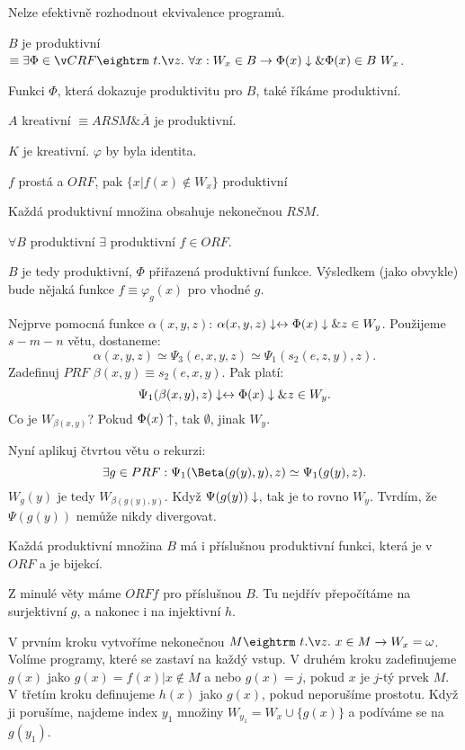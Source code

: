 \res{} Nelze efektivně rozhodnout ekvivalence programů.


\dfn{} $B$ je produktivní $\equiv \exists \Phi \in ČRF \st \forall x: W_x \in B \then \Phi(x) \da \& \Phi(x) \in B \ W_x$.

\dfn{} Funkci $\Phi$, která dokazuje produktivitu pro $B$, také říkáme produktivní.

\dfn{} $A$ kreativní $\equiv A RSM \& \overline{A}$ je produktivní.

\obs{} $K$ je kreativní. $\varphi$ by byla identita.

\obs{} $f$ prostá a $ORF$, pak $\{x | f(x) \not \in W_x\}$ produktivní

\obs{} Každá produktivní množina obsahuje nekonečnou $RSM$. 

 $\forall B$ produktivní $\exists$ produktivní $f \in ORF$.

\prf{}
$B$ je tedy produktivní, $\Phi$ přiřazená produktivní funkce. Výsledkem (jako obvykle) bude
nějaká funkce $f \equiv \varphi_g(x)$ pro vhodné $g$.

Nejprve pomocná funkce $\alpha(x,y,z)$: $\alpha(x,y,z)\downarrow \leftrightarrow \Phi(x)\downarrow \& z \in W_y$.
Použijeme $s-m-n$ větu, dostaneme:
$$ \alpha(x,y,z) \simeq \Psi_3(e,x,y,z) \simeq \Psi_1(s_2(e,z,y),z).$$
Zadefinuj $PRF$ $\beta(x,y) \equiv s_2(e,x,y)$. Pak platí:
$$ \Psi_1(\beta(x,y),z) \downarrow \leftrightarrow \Phi(x)\downarrow \& z \in W_y. $$
Co je $W_{\beta(x,y)}$? Pokud $\Phi(x) \uparrow$, tak $\emptyset$, jinak $W_y$.

Nyní aplikuj čtvrtou větu o rekurzi:
$$ \exists g \in PRF: \Psi_1(\Beta(g(y),y),z) \simeq \Psi_1(g(y),z). $$
$W_g(y)$ je tedy $W_{\beta(g(y),y)}$. Když $\Psi(g(y)) \downarrow$, tak je to rovno $W_y$. 
Tvrdím, že $\Psi(g(y))$ nemůže nikdy divergovat.
 
Každá produktivní množina $B$ má i příslušnou produktivní funkci, která je v $ORF$ a je bijekcí.

\prf{} Z minulé věty máme $ORF f$ pro příslušnou $B$. Tu nejdřív přepočítáme na surjektivní $g$,
a nakonec i na injektivní $h$.

\itemize\ibull
\: V prvním kroku vytvoříme nekonečnou $M \st x \in M \then W_x = \omega$. Volíme programy, které
se zastaví na každý vstup.
\: V druhém kroku zadefinujeme $g(x)$ jako $g(x) = f(x) | x \not \in M$ a nebo $g(x) = j$, pokud $x$ je $j$-tý
prvek $M$. 
\: V třetím kroku definujeme $h(x)$ jako $g(x)$, pokud neporušíme prostotu. Když ji porušíme, najdeme index
$y_1$ množiny $W_{y_1} = W_x \cup \{g(x)\}$ a podíváme se na $g(y_1)$. 

